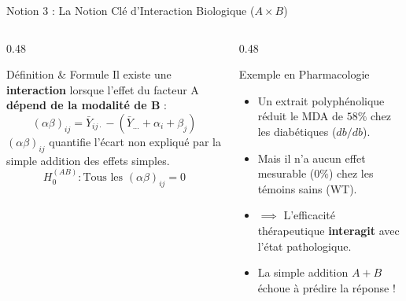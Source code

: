 \documentclass[aspectratio=169,10pt]{beamer}
\begin{document}
\begin{frame}{Notion 3 : La Notion Clé d'Interaction Biologique ($A \times B$)}
  \begin{columns}[onlytextwidth, T]
    \begin{column}{0.48\linewidth}
      \begin{conceptbox}{Définition \& Formule}
        \small
        Il existe une \textbf{interaction} lorsque l'effet du facteur A \textbf{dépend de la modalité de B} :
        \begin{equation*}
          (\alpha\beta)_{ij} = \bar{Y}_{ij\cdot} - (\bar{Y}_{\dots} + \alpha_i + \beta_j)
        \end{equation*}
        $(\alpha\beta)_{ij}$ quantifie l'écart non expliqué par la simple addition des effets simples.
        \begin{equation*}
          H_0^{(AB)} : \text{Tous les } (\alpha\beta)_{ij} = 0
        \end{equation*}
      \end{conceptbox}
    \end{column}
    \begin{column}{0.48\linewidth}
      \begin{biobox}{Exemple en Pharmacologie}
        \small
        \begin{itemize}
          \item Un extrait polyphénolique réduit le MDA de $58\%$ chez les diabétiques ($db/db$).
          \item Mais il n'a aucun effet mesurable ($0\%$) chez les témoins sains (WT).
          \item $\implies$ L'efficacité thérapeutique \textbf{interagit} avec l'état pathologique.
          \item La simple addition $A + B$ échoue à prédire la réponse !
        \end{itemize}
      \end{biobox}
    \end{column}
  \end{columns}
\end{frame}
\end{document}
